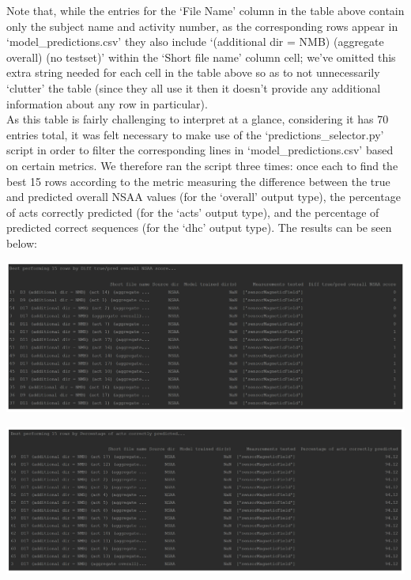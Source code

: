 \documentclass[12pt,twoside]{report}
\begin{document}
\quad Note that, while the entries for the ‘File Name’ column in the table above contain only the subject name and activity number, as the corresponding rows appear in ‘model\_predictions.csv’ they also include ‘(additional dir = NMB) (aggregate overall) (no testset)’ within the ‘Short file name’ column cell; we’ve omitted this extra string needed for each cell in the table above so as to not unnecessarily ‘clutter’ the table (since they all use it then it doesn’t provide any additional information about any row in particular).\\

\quad As this table is fairly challenging to interpret at a glance, considering it has 70 entries total, it was felt necessary to make use of the ‘predictions\_selector.py’ script in order to filter the corresponding lines in ‘model\_predictions.csv’ based on certain metrics. We therefore ran the script three times: once each to find the best 15 rows according to the metric measuring the difference between the true and predicted overall NSAA values (for the ‘overall’ output type), the percentage of acts correctly predicted (for the ‘acts’ output type), and the percentage of predicted correct sequences (for the ‘dhc’ output type). The results can be seen below:

\begin{center}
\includegraphics[scale=0.3]{project_figures/fig11_34}
\end{center}

\begin{center}
\includegraphics[scale=0.3]{project_figures/fig11_35}
\end{center}
\end{document}
